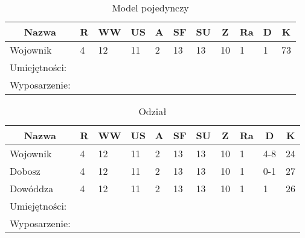 \begin{table}[h]
\caption{Model pojedynczy}

\begin{tabular}{|l|l|l|l|l|l|l|l|l|l|l|}
\hline
\multicolumn{1}{c}{Nazwa} & \multicolumn{1}{c}{R} & \multicolumn{1}{c}{WW} & \multicolumn{1}{c}{US} & \multicolumn{1}{c}{A} & \multicolumn{1}{c}{SF} & \multicolumn{1}{c}{SU} & \multicolumn{1}{c}{Z} & \multicolumn{1}{c}{Ra} & \multicolumn{1}{c}{D} & \multicolumn{1}{c}{K} \\ \hline
Wojownik & 4 & 12 & 11 & 2 & 13 & 13 & 10 & 1 & 1 & 73 \\ \hline
Umiejętności: \\ \hline
Wyposarzenie: \\ \hline
\end{tabular}

\end{table}

\begin{table}[h]
\caption{Odział}

\begin{tabular}{|l|l|l|l|l|l|l|l|l|l|l|}
\hline
\multicolumn{1}{c}{Nazwa} & \multicolumn{1}{c}{R} & \multicolumn{1}{c}{WW} & \multicolumn{1}{c}{US} & \multicolumn{1}{c}{A} & \multicolumn{1}{c}{SF} & \multicolumn{1}{c}{SU} & \multicolumn{1}{c}{Z} & \multicolumn{1}{c}{Ra} & \multicolumn{1}{c}{D} & \multicolumn{1}{c}{K} \\ \hline
Wojownik & 4 & 12 & 11 & 2 & 13 & 13 & 10 & 1 & 4-8 & 24  \\ \hline
Dobosz & 4 & 12 & 11 & 2 & 13 & 13 & 10 & 1 & 0-1 & 27 \\ \hline
Dowóddza & 4 & 12 & 11 & 2 & 13 & 13 & 10 & 1 & 1 & 26 \\ \hline
Umiejętności: \\ \hline
Wyposarzenie: \\ \hline
\end{tabular}

\end{table}

